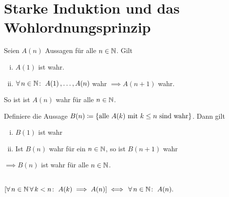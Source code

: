 \documentclass[../ana1.tex]{subfiles}
\begin{document}
\setcounter{section}{4}

\section{Starke Induktion und das Wohlordnungsprinzip}

\begin{satz}\label{satz:starke_ind}
	Seien \(A(n) \) Aussagen für alle \(n \in \mathbb{N} \). Gilt
	\begin{enumerate}[(i)]
		\item \(A(1) \) ist wahr.
		\item \(\forall \, n \in \mathbb{N} \colon \; A(1) \operatorname{,} \ldots \operatorname{,} A(n) \) wahr \(\implies A(n + 1) \) wahr.
	\end{enumerate}
	So ist ist \(A(n) \) wahr für alle \(n \in \mathbb{N} \).
\end{satz}
\begin{bew}
	Definiere die Aussage \(B(n) \coloneqq \{ \text{alle } A(k) \text{ mit } k\leq n \text{ sind wahr} \} \). Dann gilt
	\begin{enumerate}[(i)]
		\item \(B(1) \) ist wahr
		\item Ist \(B(n) \) wahr für ein \(n \in\mathbb{N} \), so ist \(B(n+1) \) wahr
	\end{enumerate}
	\(\implies B(n) \) ist wahr für alle \(n \in \mathbb{N} \).
\end{bew}

\begin{bem} \leavevmode \\
	\(\displaystyle\left[\forall \, n \in \mathbb{N} \, \forall \, k < n \colon \; A(k) \implies A(n)\right] \iff \, \forall \, n \in \mathbb{N} \colon \; A(n). \)
\end{bem}
\end{document}
